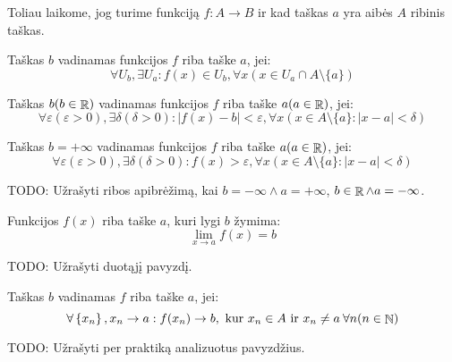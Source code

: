 Toliau laikome, jog turime funkciją $f : A \to B$ ir kad taškas $a$ 
yra aibės $A$ ribinis taškas.

\begin{defn}
  \label{limfed}
  Taškas $b$ vadinamas funkcijos $f$ riba taške $a$, jei:
  \[
  \forall U_b, \exists U_a : f(x) \in U_b,%
  \forall x (x \in U_a \cap A \setminus \{a\})
  \]
\end{defn}

\begin{defn}
  Taškas $b (b \in \mathop{\mathbb{R}})$ vadinamas funkcijos $f$ riba taške 
  $a (a \in \mathop{\mathbb{R}})$, jei:
  \[
  \forall \varepsilon (\varepsilon > 0), \exists \delta (\delta > 0):%
  |f(x) - b| < \varepsilon,%
  \forall x (x \in A \setminus \{a\} : |x - a| < \delta)
  \]
\end{defn}

\begin{defn}
  Taškas $b = +\infty$ vadinamas funkcijos $f$ riba taške $a (a \in \mathop{\mathbb{R}})$,
  jei:
  \[
  \forall \varepsilon (\varepsilon > 0), \exists \delta (\delta > 0) :%
  f(x) > \varepsilon,%
  \forall x (x \in A \setminus \{a\} : |x - a| < \delta)
  \]
\end{defn}

TODO: Užrašyti ribos apibrėžimą, kai $b=-\infty \land a=+\infty$, 
$b \in \mathop{\mathbb{R}} \land a=-\infty$.

\begin{notation}
  Funkcijos $f(x)$ riba taške $a$, kuri lygi $b$ žymima:
  \[
  \lim _{x \to a} f(x) = b
  \]
\end{notation}

TODO: Užrašyti duotąjį pavyzdį.

\begin{defn}
  \label{limfs}
  Taškas $b$ vadinamas $f$ riba taške $a$, jei:
  \[
  \forall \left\{ x_{n} \right\}, x_{n} \to a :%
  f(x_{n}) \to b, \text{ kur } x_{n} \in A \text{ ir } x_{n} \neq a \:%
  \forall n (n \in \NSET)%
  \]
\end{defn}

TODO: Užrašyti per praktiką analizuotus pavyzdžius.


